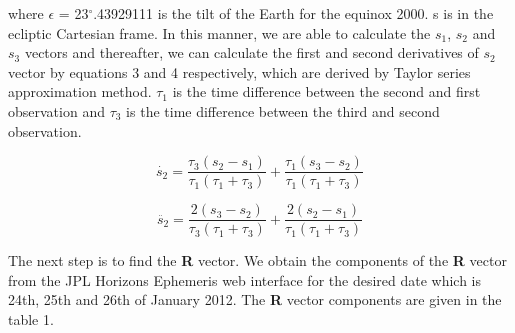 \documentclass[letterpaper,12pt]{article}
\begin{document}
where \begin{math}\epsilon\end{math} = 23\begin{math} ^{\circ} \end{math}.43929111 is the tilt of the Earth for the equinox 2000. s is in the ecliptic Cartesian frame.
In this manner, we are able to calculate the \begin{math}s_{1}\end{math}, \begin{math}s_{2}\end{math} and \begin{math}s_{3}\end{math} vectors and thereafter, we can calculate the first and second derivatives of \begin{math} s_{2} \end{math} vector by equations 3 and 4 respectively, which are derived by Taylor series approximation method. \begin{math} \tau_{1} \end{math} is the time difference between the second and first observation and \begin{math} \tau_{3} \end{math} is the time difference between the third and second observation.


\begin{equation}
\dot{s_{2}}=\frac{\tau_{3}(s_{2}-s_{1})}{\tau_{1}(\tau_{1}+\tau_{3})}+\frac{\tau_{1}(s_{3}-s_{2})}{\tau_{1}(\tau_{1}+\tau_{3})}
\end{equation}


\begin{equation}
\ddot{s_{2}}=\frac{2(s_{3}-s_{2})}{\tau_{3}(\tau_{1}+\tau_{3})}+\frac{2(s_{2}-s_{1})}{\tau_{1}(\tau_{1}+\tau_{3})}
\end{equation}

The next step is to find the {\bf R} vector. We obtain the components of the {\bf R} vector from the JPL Horizons Ephemeris web interface for the desired date which is 24th, 25th and 26th of January 2012.
The {\bf R} vector components are given in the table 1.
\end{document}
